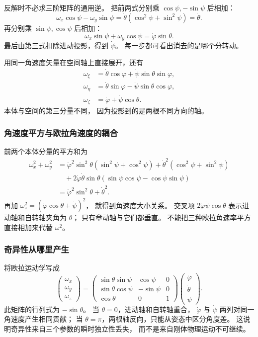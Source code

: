\documentclass[UTF8,zihao=-4,fontset=fandol,a4paper]{ctexart}
\begin{document}
反解时不必求三阶矩阵的通用逆。
把前两式分别乘 $\cos\psi,-\sin\psi$ 后相加：
\[
\omega_x\cos\psi-\omega_y\sin\psi
=\dot\theta(\cos^2\psi+\sin^2\psi)=\dot\theta.
\]
再分别乘 $\sin\psi,\cos\psi$ 后相加：
\[
\omega_x\sin\psi+\omega_y\cos\psi
=\dot\varphi\sin\theta.
\]
最后由第三式扣除进动投影，得到 $\dot\psi$。
每一步都可看出消去的是哪个分转动。

用同一角速度矢量在空间轴上直接展开，还有
\[
\begin{aligned}
\omega_\xi&=\dot\theta\cos\varphi+\dot\psi\sin\theta\sin\varphi,\\
\omega_\eta&=\dot\theta\sin\varphi-\dot\psi\sin\theta\cos\varphi,\\
\omega_\zeta&=\dot\varphi+\dot\psi\cos\theta.
\end{aligned}
\]
本体与空间的第三分量不同，
因为投影到的是两根不同方向的轴。

\subsubsection*{角速度平方与欧拉角速度的耦合}
前两个本体分量的平方和为
\begin{align*}
\omega_x^2+\omega_y^2
&=\dot\varphi^2\sin^2\theta(\sin^2\psi+\cos^2\psi)
+\dot\theta^2(\cos^2\psi+\sin^2\psi)\\
&\quad+2\dot\varphi\dot\theta\sin\theta
(\sin\psi\cos\psi-\cos\psi\sin\psi)\\
&=\dot\varphi^2\sin^2\theta+\dot\theta^2.
\end{align*}
再加 $\omega_z^2=(\dot\varphi\cos\theta+\dot\psi)^2$，
就得到角速度大小关系。
交叉项 $2\dot\varphi\dot\psi\cos\theta$ 表示进动轴和自转轴夹角为 $\theta$；
只有章动轴与它们都垂直。
不能把三种欧拉角速率平方直接相加来代替 $\omega^2$。

\subsubsection*{奇异性从哪里产生}
将欧拉运动学写成
\[
\begin{pmatrix}\omega_x\\\omega_y\\\omega_z\end{pmatrix}
=
\begin{pmatrix}
\sin\theta\sin\psi&\cos\psi&0\\
\sin\theta\cos\psi&-\sin\psi&0\\
\cos\theta&0&1
\end{pmatrix}
\begin{pmatrix}\dot\varphi\\\dot\theta\\\dot\psi\end{pmatrix}.
\]
此矩阵的行列式为 $-\sin\theta$。
当 $\theta=0$，进动轴和自转轴重合，
$\dot\varphi$ 与 $\dot\psi$ 两列对同一角速度产生相同贡献；
当 $\theta=\pi$，两根轴反向，只能从姿态中区分角度差。
这说明奇异性来自三个参数的瞬时独立性丢失，
而不是来自刚体物理运动不可继续。
\end{document}
